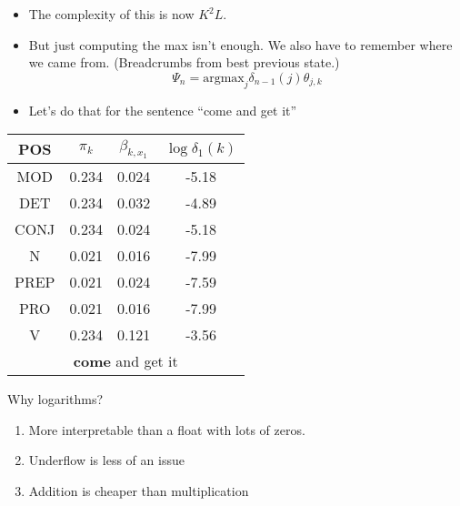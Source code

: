 \documentclass{beamer}
\begin{document}
\begin{frame}

\begin{itemize}
\item The complexity of this is now $K^2 L$.
\item But just computing the max isn't enough.  We also have to remember where we came from.  (Breadcrumbs from best previous state.)
\begin{equation}
\Psi_{n} = \mbox{argmax}_j \delta_{n-1}(j)\theta_{j,k}
\end{equation}
\pause
\item Let's do that for the sentence ``come and get it''

\end{itemize}
\end{frame}

\begin{frame}

\begin{center}
\begin{tabular}{|c|c|c|c|}
\hline
POS  & $\pi_k$ & $\beta_{k,x_1}$&  $ \log{\delta_1(k)}$ \\
\hline
MOD  & 0.234 & 0.024 & -5.18 \\ 
DET   & 0.234 & 0.032 & -4.89 \\ 
CONJ  & 0.234 & 0.024 & -5.18\\ 
N   & 0.021 & 0.016 & -7.99 \\ 
PREP & 0.021 & 0.024 & -7.59 \\ 
PRO  & 0.021 & 0.016 & -7.99 \\ 
V  & 0.234 & 0.121 & -3.56 \\ 
\hline
\multicolumn{4}{c}{{\bf come} and get it}
\end{tabular}

\end{center}

Why logarithms?
\begin{enumerate}
\item More interpretable than a float with lots of zeros.
\item Underflow is less of an issue
\item Addition is cheaper than multiplication 
\end{enumerate}

\end{frame}
\end{document}
